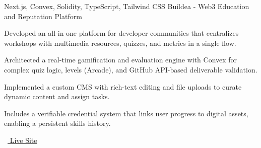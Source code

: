 \begin{cventries}
  \vspace{6mm}
  \cventry
    {Next.js, Convex, Solidity, TypeScript, Tailwind CSS} %
    {Buildea - Web3 Education and Reputation Platform} %
    {} %
    {} %
    {
      \begin{cvitems} %
        \item {Developed an all-in-one platform for developer communities that centralizes workshops with multimedia resources, quizzes, and metrics in a single flow.}
        \item {Architected a real-time gamification and evaluation engine with Convex for complex quiz logic, levels (Arcade), and GitHub API-based deliverable validation.}
        \item {Implemented a custom CMS with rich-text editing and file uploads to curate dynamic content and assign tasks.}
        \item {Includes a verifiable credential system that links user progress to digital assets, enabling a persistent skills history.}
        \item {\faLink\ \href{https://app.buildea.dev/}{ Live Site}}
      \end{cvitems}
    }

\end{cventries}
